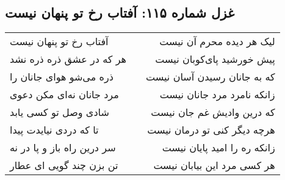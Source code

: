 \begin{center}
\section*{غزل شماره ۱۱۵: آفتاب رخ تو پنهان نیست}
\label{sec:115}
\begin{longtable}{l p{0.5cm} r}
آفتاب رخ تو پنهان نیست
&&
لیک هر دیده محرم آن نیست
\\
هر که در عشق ذره ذره نشد
&&
پیش خورشید پای‌کوبان نیست
\\
ذره می‌شو هوای جانان را
&&
که به جانان رسیدن آسان نیست
\\
مرد جانان نه‌ای مکن دعوی
&&
زانکه نامرد مرد جانان نیست
\\
شادی وصل تو کسی یابد
&&
که درین وادیش غم جان نیست
\\
تا که دردی نیایدت پیدا
&&
هرچه دیگر کنی تو درمان نیست
\\
سر درین راه باز و پا در نه
&&
زانکه ره را امید پایان نیست
\\
تن بزن چند گویی ای عطار
&&
هر کسی مرد این بیابان نیست
\\
\end{longtable}
\end{center}
